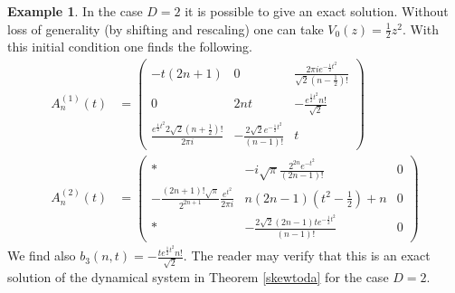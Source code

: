 \documentclass[12pt]{article}
\theoremstyle{definition}
\newtheorem{exmp}{Example}[section]
\begin{document}
\begin{exmp}\label{exactsolution} In the case $D=2$ it is possible to give an exact solution.  Without loss of generality (by shifting and rescaling) one can take $V_0(z) = \frac{1}{2}z^2$.  With this initial condition one finds the following.
\begin{align*}
A_{n}^{(1)}(t) &= \left( \begin{matrix}
-t (2n+1) & 0 & \frac{2\pi i e^{-\frac{1}{2}t^2}}{\sqrt{2}\left( n-\frac{1}{2} \right)!}  \\
0 & 2nt &  - \frac{e^{\frac{1}{2}t^2}n!}{\sqrt{2}}  \\
 \frac{e^{\frac{1}{2}t^2} 2 \sqrt{2} \left( n + \frac{1}{2} \right)!}{2\pi i }  &- \frac{2\sqrt{2} e^{-\frac{1}{2}t^2}}{(n-1)!} & t\end{matrix} \right) \\
A_{n}^{(2)}(t) &= \left( \begin{matrix}
  \ast & - i \sqrt{\pi} \frac{2^{2n} e^{-t^2}}{(2n-1)!} & 0 \\
 -\frac{(2n+1)! \sqrt{\pi}}{2^{2n+1}} \frac{e^{t^2}}{2\pi i} & n(2n-1)(t^2 - \frac{1}{2})+n & 0 \\
\ast & - \frac{2\sqrt{2}(2n-1) t e^{-\frac{1}{2}t^2}}{(n-1)!} &  0 \end{matrix} \right)
\end{align*}
We find also $b_3(n,t) =  - \frac{t e^{\frac{1}{2}t^2}n!}{\sqrt{2}}$. The reader may verify that this is an exact solution of the dynamical system in Theorem \ref{skewtoda} for the case $D=2$. 
\end{exmp}
\end{document}
